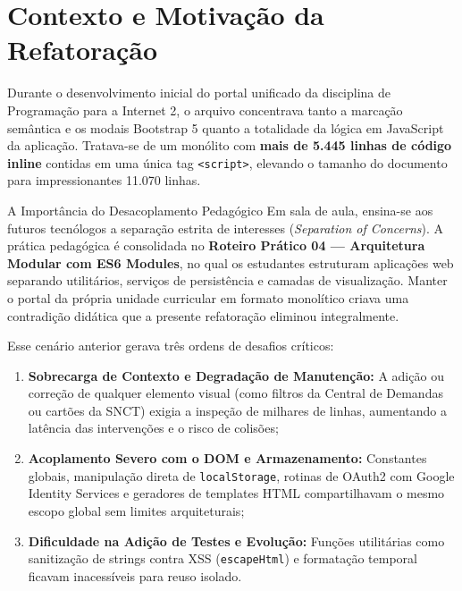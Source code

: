 \begin{mapaAula}
\end{mapaAula}

\section{Contexto e Motivação da Refatoração}\label{sec:contexto}

Durante o desenvolvimento inicial do portal unificado da disciplina de Programação para a Internet 2, o arquivo  concentrava tanto a marcação semântica e os modais Bootstrap 5 quanto a totalidade da lógica em JavaScript da aplicação. Tratava-se de um monólito com \textbf{mais de 5.445 linhas de código inline} contidas em uma única tag \texttt{<script>}, elevando o tamanho do documento para impressionantes 11.070 linhas.

\begin{conceito}{A Importância do Desacoplamento Pedagógico}
Em sala de aula, ensina-se aos futuros tecnólogos a separação estrita de interesses (\textit{Separation of Concerns}). A prática pedagógica é consolidada no \textbf{Roteiro Prático 04 — Arquitetura Modular com ES6 Modules}, no qual os estudantes estruturam aplicações web separando utilitários, serviços de persistência e camadas de visualização. Manter o portal da própria unidade curricular em formato monolítico criava uma contradição didática que a presente refatoração eliminou integralmente.
\end{conceito}

Esse cenário anterior gerava três ordens de desafios críticos:
\begin{enumerate}
  \item \textbf{Sobrecarga de Contexto e Degradação de Manutenção:} A adição ou correção de qualquer elemento visual (como filtros da Central de Demandas ou cartões da SNCT) exigia a inspeção de milhares de linhas, aumentando a latência das intervenções e o risco de colisões;
  \item \textbf{Acoplamento Severo com o DOM e Armazenamento:} Constantes globais, manipulação direta de \texttt{localStorage}, rotinas de OAuth2 com Google Identity Services e geradores de templates HTML compartilhavam o mesmo escopo global sem limites arquiteturais;
  \item \textbf{Dificuldade na Adição de Testes e Evolução:} Funções utilitárias como sanitização de strings contra XSS (\texttt{escapeHtml}) e formatação temporal ficavam inacessíveis para reuso isolado.
\end{enumerate}

